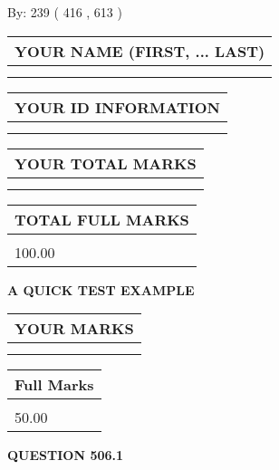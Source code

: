 \documentclass[12pt]{article}
\begin{document}
   
\hspace{1.0in} By: 
 239 ( 416 ,  613 )
   
   
   
   
\newpage 
\setcounter{page}{ 
   506001 } 
   
   
   
   
\noindent\begin{tabular}{|l|}
\hline
YOUR NAME (FIRST, ... LAST)  \\
\hline
 \\ 
 \\ 
\hline
\end{tabular}
\hspace{0.05in} \begin{tabular}{|l|}
\hline
 YOUR   ID   INFORMATION  \\
\hline
 \\ 
 \\ 
\hline
\end{tabular}
   
   
\vspace{0.2in}\noindent\begin{tabular}{|l|}
\hline
YOUR TOTAL MARKS  \\
\hline
 \\ 
 \\ 
\hline
\end{tabular}
\hspace{0.05in} \begin{tabular}{|l|}
\hline
TOTAL FULL MARKS  \\
\hline
 \\ 
100.00 \\
\hline
\end{tabular}
   
   
 \vspace{0.2in}
{\LARGE {\textbf{ A QUICK TEST EXAMPLE}}}
   
   
  
\vspace{0.2in}
  
\noindent\begin{tabular}{|l|}
\hline
 YOUR MARKS  \\
\hline
 \\ 
 \\ 
\hline
\end{tabular}
\hspace{0.05in} \begin{tabular}{|l|}
\hline
 Full Marks  \\
\hline
 \\ 
50.00 \\
\hline
\end{tabular}
{\textbf{\Large{QUESTION
506.1 
}}}
  
\end{document}
